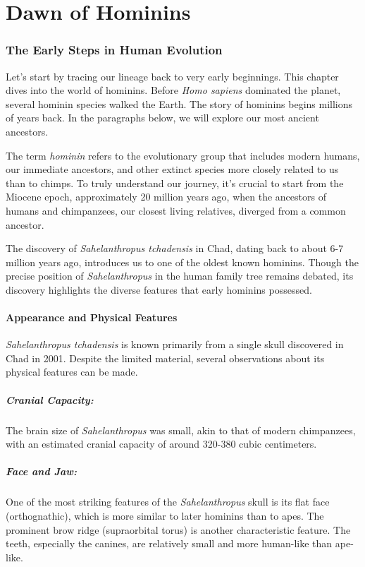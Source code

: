 \chapter{Dawn of Hominins}
\subsection*{The Early Steps in Human Evolution}
Let's start by tracing our lineage back to very early beginnings. This chapter dives into the world of hominins. Before \textit{Homo sapiens} dominated the planet, several hominin species walked the Earth. The story of hominins begins millions of years back. In the paragraphs below, we will explore our most ancient ancestors.

The term \textit{hominin} refers to the evolutionary group that includes modern humans, our immediate ancestors, and other extinct species more closely related to us than to chimps. To truly understand our journey, it's crucial to start from the Miocene epoch, approximately 20 million years ago, when the ancestors of humans and chimpanzees, our closest living relatives, diverged from a common ancestor.

The discovery of \textit{Sahelanthropus tchadensis} in Chad, dating back to about 6-7 million years ago, introduces us to one of the oldest known hominins. Though the precise position of \textit{Sahelanthropus} in the human family tree remains debated, its discovery highlights the diverse features that early hominins possessed.

\subsubsection*{Appearance and Physical Features}
\textit{Sahelanthropus tchadensis} is known primarily from a single skull discovered in Chad in 2001. Despite the limited material, several observations about its physical features can be made.

\paragraph{Cranial Capacity:} The brain size of \textit{Sahelanthropus} was small, akin to that of modern chimpanzees, with an estimated cranial capacity of around 320-380 cubic centimeters.

\paragraph{Face and Jaw:} One of the most striking features of the \textit{Sahelanthropus} skull is its flat face (orthognathic), which is more similar to later hominins than to apes. The prominent brow ridge (supraorbital torus) is another characteristic feature. The teeth, especially the canines, are relatively small and more human-like than ape-like.

